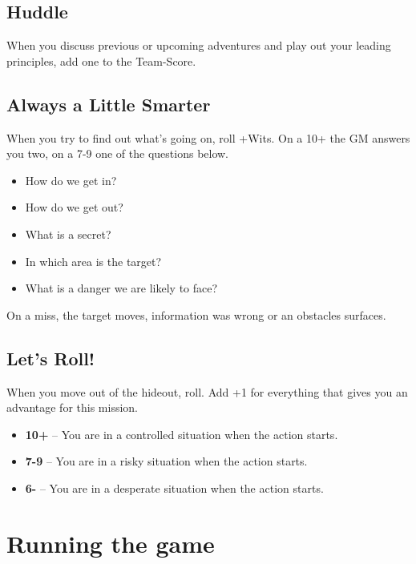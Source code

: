 \documentclass{book}
\begin{document}
\section*{Huddle}
When you discuss previous or upcoming adventures and play out your leading principles, add one to the Team-Score.

\section*{Always a Little Smarter}
When you try to find out what's going on, roll +Wits. On a 10+ the GM answers you two, on a 7-9 one of the questions below.
\begin{itemize}
    \item How do we get in?
    \item How do we get out?
    \item What is a secret?
    \item In which area is the target?
    \item What is a danger we are likely to face?
\end{itemize}
On a miss, the target moves, information was wrong or an obstacles surfaces.

\section*{Let's Roll!}
When you move out of the hideout, roll. Add +1 for everything that gives you an advantage for this mission.
\begin{itemize}
    \item \textbf{10+} -- You are in a controlled situation when the action starts.
    \item \textbf{7-9} -- You are in a risky situation when the action starts.
    \item \textbf{6-} -- You are in a desperate situation when the action starts.
\end{itemize}

\chapter*{Running the game}
\end{document}

